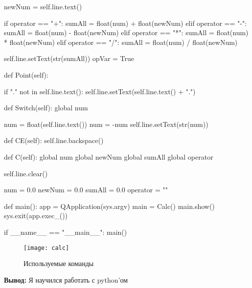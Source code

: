         newNum = self.line.text()

        if operator == "+":
            sumAll = float(num) + float(newNum)
        elif operator == "-":
            sumAll = float(num) - float(newNum)
        elif operator == "*":
            sumAll = float(num) * float(newNum)
        elif operator == "/":
            sumAll = float(num) / float(newNum)

        self.line.setText(str(sumAll))
        opVar = True

    def Point(self):

        if "." not in self.line.text():
            self.line.setText(self.line.text() + ".")

    def Switch(self):
        global num

        num = float(self.line.text())
        num = -num
        self.line.setText(str(num))

    def CE(self):
        self.line.backspace()

    def C(self):
        global num
        global newNum
        global sumAll
        global operator

        self.line.clear()

        num = 0.0
        newNum = 0.0
        sumAll = 0.0
        operator = ""

def main():
    app = QApplication(sys.argv)
    main = Calc()
    main.show()
    sys.exit(app.exec\_())

if \_\_name\_\_ == "\_\_main\_\_":
    main()

\newpage

\begin{figure}[h]
\centering
\texttt{[image: calc]}
\caption{Используемые команды}
\label{fig:calc}
\end{figure}


\textbf{Вывод:} Я научился работать с python'ом



